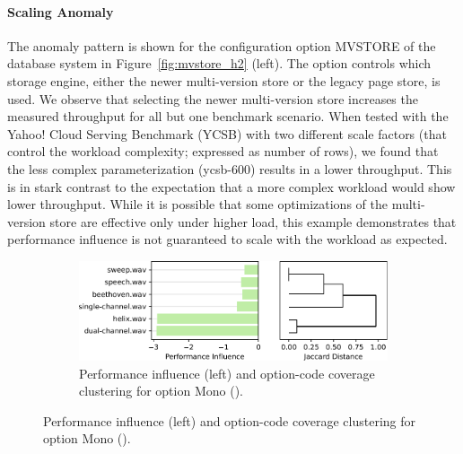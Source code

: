 {{{{\paragraph{Scaling Anomaly} The anomaly pattern is shown for the configuration option \textsf{MVSTORE} of the database system \htwo in Figure~\ref{fig:mvstore_h2} (left). The option controls which storage engine, either the newer multi-version store or the legacy page store, is used. We observe that selecting the newer multi-version store increases the measured throughput for all but one benchmark scenario. When tested with the Yahoo! Cloud Serving Benchmark (YCSB) with two different scale factors (that control the workload complexity; expressed as number of rows), we found that the less complex parameterization (ycsb-600) results in a lower throughput. This is in stark contrast to the expectation that a more complex workload would show lower throughput. While it is possible that some optimizations of the multi-version store are effective only under higher load, this example demonstrates that performance influence is not guaranteed to scale with the workload as expected. 

\vspace{1mm}

}

\begin{figure}

	\begin{subfigure}{\linewidth}
		\centering
		\includegraphics[width=0.99\linewidth]{rq23/Mono.pdf}
		\caption{Performance influence (left) and option-code coverage clustering for option \textsf{Mono} (\jumper).}
		\label{fig:mono_jump3r}
	\end{subfigure}
	

\end{figure}}}}
